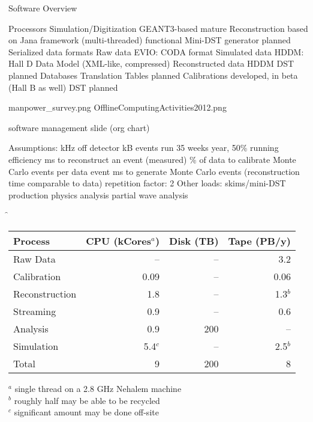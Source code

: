 Software Overview


\I Processors
   \I Simulation/Digitization
      \I GEANT3-based
      \I mature
   \I Reconstruction
      \I based on Jana framework (multi-threaded)
      \I functional
   \I Mini-DST generator
      \I planned
\I Serialized data formats
   \I Raw data
      \I EVIO: CODA format
   \I Simulated data
      \I HDDM: Hall D Data Model (XML-like, compressed)
   \I Reconstructed data
      \I HDDM
   \I DST
      \I planned
\I Databases
   \I Translation Tables
      \I planned
   \I Calibrations
      \I developed, in beta (Hall B as well)
   \I DST
      \I planned


manpower_survey.png
OfflineComputingActivities2012.png 


software management slide (org chart)


\I Assumptions:
    kHz off detector
    kB events
   \I run 35 weeks year, 50\% running efficiency
    ms to reconstruct an event (measured)
   \% of data to calibrate
    Monte Carlo events per data event
    ms to generate Monte Carlo events (reconstruction time comparable to data)
   \I repetition factor: 2
   \I Other loads:
      \I skims/mini-DST production
      \I physics analysis
      \I partial wave analysis

\f{
\bc
\begin{tabular}{|l|r|r|r|}
\hline
Process & CPU (kCores$^a$) & Disk (TB) & Tape (PB/y)\\
\hline
Raw Data & -- & -- & 3.2 \\
Calibration & 0.09 & -- & 0.06 \\
Reconstruction & 1.8 & -- & 1.3$^b$ \\
Streaming & 0.9 & -- & 0.6 \\
Analysis & 0.9 & 200 & -- \\
Simulation & 5.4$^c$ & -- & 2.5$^b$ \\
\hline
Total & 9 & 200 & 8 \\
\hline
\end{tabular}
\ec
$^a$ single thread on a 2.8 GHz Nehalem machine \\
$^b$ roughly half may be able to be recycled \\
$^c$ significant amount may be done off-site \\
}

